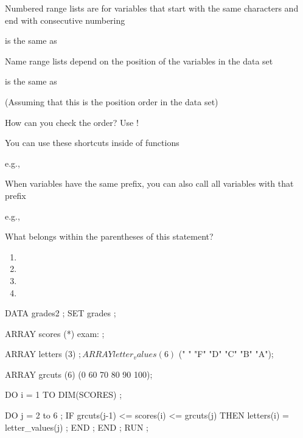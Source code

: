 \begin{frame}
\bi
\item Numbered range lists are for variables that start with the same characters and end with consecutive numbering
    \bi
    \item {} is the same as 
    \ei
\item Name range lists depend on the position of the variables in the data set
    \bi
    \item {} is the same as 
    \item[](Assuming that this is the position order in the data set)
    \item How can you check the order?  Use !
    \ei
\item You can use these shortcuts inside of functions
    \bi
    \item e.g., 
    \ei
\item When variables have the same prefix, you can also call all variables with that prefix
    \bi
    \item e.g., 
    \ei
\ei
\end{frame}


\begin{frame}[fragile]
\begin{center}
\end{center}
\vskip10pt
\begin{clicker}{What belongs within the parentheses of this  statement?}
\begin{enumerate}
\item {}
\item {}
\item {}
\item {}
\end{enumerate}
\end{clicker}
\end{frame}

\begin{frame}[fragile]
\footnotesize
\begin{code}{.0}
DATA grades2 ;
   SET grades ;

   ARRAY scores (*) exam: ;

   ARRAY letters (3) $ ;

   ARRAY letter_values (6) $ (" " "F" "D" "C" "B" "A");

   ARRAY grcuts (6) (0 60 70 80 90 100);

   DO i = 1 TO DIM(SCORES) ;
		
   DO j = 2 to 6 ;
       IF grcuts(j-1) <= scores(i) <= grcuts(j)
       THEN letters(i) = letter_values(j) ;
   END ;
   END ;
RUN ;
\end{code}
\emp
\end{frame}



 
